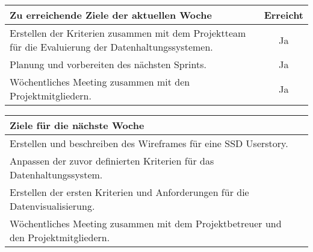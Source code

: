 \begin{tabularx}{\textwidth}{Xc}
    \arrayrulecolor{OliveGreen}
    \toprule
    {\bfseries Zu erreichende Ziele der aktuellen Woche} & {\bfseries Erreicht} \\
    \midrule[2pt]
    Erstellen der Kriterien zusammen mit dem Projektteam für die Evaluierung
    der Datenhaltungssystemen. &Ja                \\
    \rowcolor{OliveGreen!15}
    Planung und vorbereiten des nächsten Sprints.          &Ja                \\
    \rowcolor{White}
    Wöchentliches Meeting zusammen mit den Projektmitgliedern.  &Ja           \\
   \bottomrule[2pt]
\end{tabularx}
%
\vspace{1cm}
%
\begin{tabularx}{\textwidth}{Xc}
    \arrayrulecolor{OliveGreen}
    \toprule
    {\bfseries Ziele für die nächste Woche}              &                   \\
    \midrule[2pt]
    Erstellen und beschreiben des Wireframes für eine SSD Userstory.  &       \\
    \rowcolor{OliveGreen!15}
    Anpassen der zuvor definierten Kriterien für das Datenhaltungssystem. &   \\
    \rowcolor{White}
    Erstellen der ersten Kriterien und Anforderungen für die
    Datenvisualisierung.             &                   \\
    \rowcolor{OliveGreen!15}
    Wöchentliches Meeting zusammen mit dem Projektbetreuer und den
    Projektmitgliedern.  & \\
\end{tabularx}
